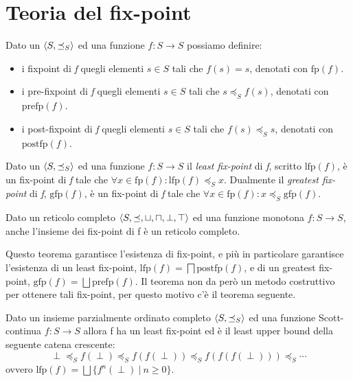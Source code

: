 \section{Teoria del fix-point}

\begin{definition}
Dato un \(\langle S, \preceq_{S}\rangle\) ed una funzione \(f:S\rightarrow S\) possiamo definire:
\begin{itemize}
\setlength\itemsep{0em}
	\item i fixpoint di \emph{f} quegli elementi \(s\in S\) tali che \(f(s)=s\), denotati con \(\textrm{fp}(f)\).
	\item i pre-fixpoint di \emph{f} quegli elementi \(s\in S\) tali che \(s\preceq_S f(s)\), denotati con \(\textrm{prefp}(f)\).
	\item i post-fixpoint di \emph{f} quegli elementi \(s\in S\) tali che \(f(s)\preceq_S s\), denotati con \(\textrm{postfp}(f)\).
\end{itemize}
\end{definition}

\begin{definition}
Dato un \(\langle S, \preceq_{S}\rangle\) ed una funzione \(f:S\rightarrow S\) il \textit{least fix-point} di \textit{f}, scritto \(\textrm{lfp}(f)\), è un fix-point di \textit{f} tale che \(\forall x\in\textrm{fp}(f):\textrm{lfp}(f)\preceq_S x\). Dualmente il \textit{greatest fix-point} di \textit{f}, \(\textrm{gfp}(f)\), è un fix-point di \textit{f} tale che \(\forall x\in\textrm{fp}(f):x\preceq_S \textrm{gfp}(f)\).
\end{definition}

\begin{theorem}
Dato un reticolo completo \(\langle S, \preceq,\sqcup, \sqcap, \perp, \top\rangle\) ed una funzione monotona \(f:S\rightarrow S\), anche l'insieme dei fix-point di f è un reticolo completo. 
\end{theorem}

Questo teorema garantisce l'esistenza di fix-point, e più in particolare garantisce l'esistenza di un least fix-point, \(\textrm{lfp}(f)=\bigsqcap\textrm{postfp}(f)\), e di un greatest fix-point, \(\textrm{gfp}(f)=\bigsqcup\textrm{prefp}(f)\). Il teorema non da però un metodo costruttivo per ottenere tali fix-point, per questo motivo c'è il teorema seguente.

\begin{theorem}
Dato un insieme parzialmente ordinato completo \(\langle S, \preceq_{S}\rangle\) ed una funzione Scott-continua \(f:S\rightarrow S\) allora f ha un least fix-point ed è il least upper bound della seguente catena crescente:
\[\perp\preceq_S f(\perp) \preceq_S f(f(\perp)) \preceq_S f(f(f(\perp))) \preceq_S \cdots\]
ovvero \(\textrm{lfp}(f)=\bigsqcup\{f^n(\perp)\ |\ n\geq 0\}\).
\end{theorem}


